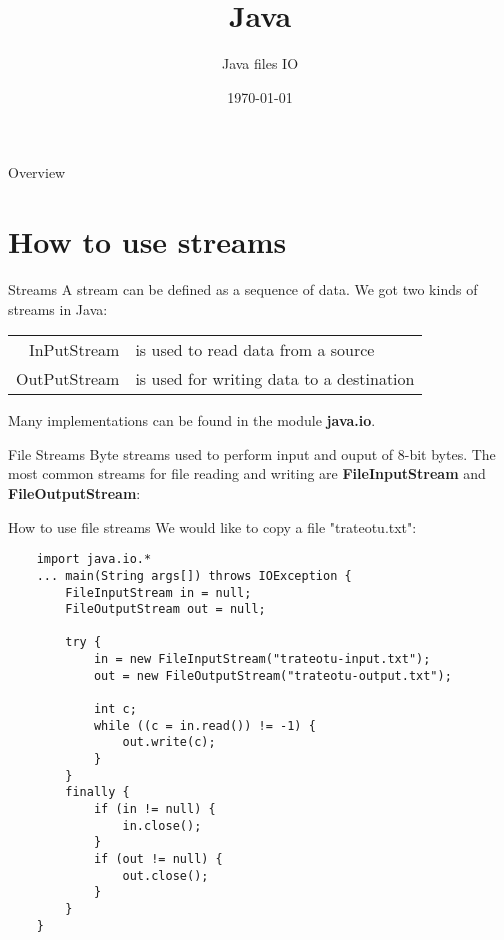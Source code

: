 


\usepackage{qtree}

\title{Java}
\subtitle{Java files IO}
\date{\today}

\usepackage{color}


\begin{frame}
	\titlepage
\end{frame}

\begin{frame}{Overview}
	\tableofcontents
\end{frame}

\section{How to use streams}
\begin{frame}{Streams}
	A stream can be defined as a sequence of data. We got two kinds of streams in Java:
	\vfill
	\begin{tabular}{rl}
		InPutStream&is used to read data from a source\\
		OutPutStream&is used for writing data to a destination
	\end{tabular}
	\vfill
	Many implementations can be found in the module \textbf{java.io}.
\end{frame}

\begin{frame}[fragile]{File Streams}
	Byte streams used to perform input and ouput of 8-bit bytes. The most common streams for file reading and writing are \textbf{FileInputStream} and \textbf{FileOutputStream}:\\
	
\end{frame}

\begin{frame}[fragile]{How to use file streams}
	We would like to copy a file "trateotu.txt":
	\begin{lstlisting}
	import java.io.*
	... main(String args[]) throws IOException {
		FileInputStream in = null;
		FileOutputStream out = null;
		
		try {
			in = new FileInputStream("trateotu-input.txt");
			out = new FileOutputStream("trateotu-output.txt");
			
			int c;
			while ((c = in.read()) != -1) {
				out.write(c);
			}
		}
		finally {
			if (in != null) {
				in.close();
			}
			if (out != null) {
				out.close();
			}
		}
	}
	\end{lstlisting}
\end{frame}


